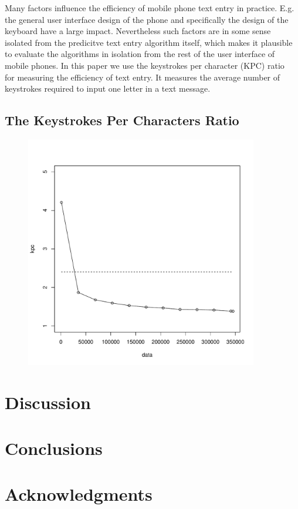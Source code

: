 \documentclass{llncs}
\begin{document}
Many factors influence the efficiency of mobile phone text entry in
practice. E.g. the general user interface design of the phone and
specifically the design of the keyboard have a large
impact. Nevertheless such factors are in some sense isolated from the
predicitve text entry algorithm itself, which makes it plausible to
evaluate the algorithms in isolation from the rest of the user
interface of mobile phones. In this paper we use the keystrokes per
character (KPC) ratio~\cite{MacKenzie02kspc} for measuring the efficiency of text entry. It
measures the average number of keystrokes required to input one letter
in a text message.


\subsection{The Keystrokes Per Characters Ratio}



\begin{figure}[hbt]
\includegraphics[width=4in]{finnish_kpc_figure.pdf}
\end{figure}

\section{Discussion}

\section{Conclusions}

\section{Acknowledgments}



\end{document}
